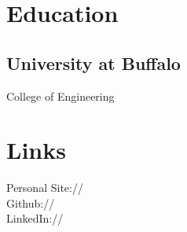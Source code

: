 \documentclass[]{deedy-resume-openfont}
\begin{document}
%
%
\lastupdated

%
%



%
%

\begin{minipage}[t]{0.33\textwidth}


\section{Education}

\subsection{University at Buffalo}

College of Engineering \\
\sectionsep


\section{Links}
Personal Site:// \href{https://alexander.directory}{} \\
Github:// \href{https://github.com/xanderrman}{} \\
LinkedIn://  \href{https://www.linkedin.com/in/alex-anelli}{} \\
\sectionsep



\end{minipage}
\end{document}
